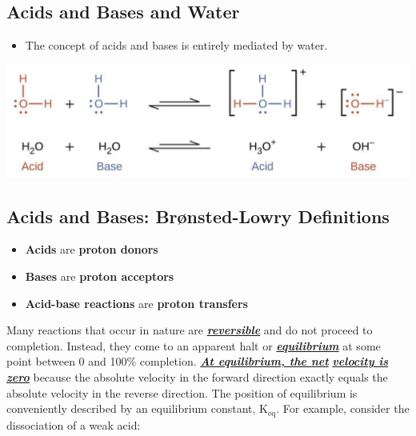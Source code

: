 \documentclass[10pt]{article}
\begin{document}
\subsection*{Acids and Bases and Water}
\begin{itemize}
    \item The concept of acids and bases is entirely mediated by water.
\end{itemize}
\begin{center}
    \includegraphics[width=\textwidth]{L3_1.png}
\end{center}
\subsection*{Acids and Bases: Brønsted-Lowry Definitions}
\begin{itemize}
    \item \textbf{Acids} are \textbf{proton donors}
    \item \textbf{Bases} are \textbf{proton acceptors}
    \item \textbf{Acid-base reactions} are \textbf{proton transfers}
\end{itemize}
Many reactions that occur in nature are \textbf{\textit{\underline{reversible}}} and do not proceed to completion.
Instead, they come to an apparent halt or \textbf{\textit{\underline{equilibrium}}} at some point between 0 and 100\% completion.
\textbf{\textit{\underline{At equilibrium, the net}}} \textbf{\textit{\underline{velocity is zero}}} because the absolute velocity in the forward direction exactly
equals the absolute velocity in the reverse direction.
The position of equilibrium is conveniently described by an equilibrium constant, K$_{\text{eq}}$.
For example, consider the dissociation of a weak acid:
\end{document}
